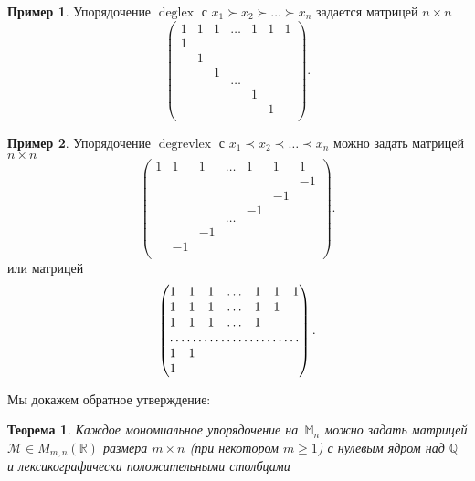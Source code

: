 \documentclass[a4paper,reqno,12pt]{amsart}
\theoremstyle{plain}
\newtheorem{theorem}{Теорема}[section]
\theoremstyle{remark}
\theoremstyle{definition}
\newtheorem{example}{Пример}[section]
\renewcommand{\ge}{\geqslant}
\DeclareMathOperator{\deglex}{deglex}
\DeclareMathOperator{\degrevlex}{degrevlex}
\newcommand{\M} {\mathbb{M}}
\newcommand{\Q}{\mathbb{Q}}
\newcommand{\R}{\mathbb{R}}
\newcommand{\Mat}{\mathcal{M}}
\newcommand{\admOrd}{\prec}
\newcommand{\admOrdG}{\succ}
\begin{document}
\begin{example}
 Упорядочение $\deglex$ с $x_1 \admOrdG x_2 \admOrdG \ldots \admOrdG x_n$ задается матрицей ${n \times n}$
{
$$
 \begin{pmatrix}
  1 & 1 & 1 & \ldots & 1 & 1 & 1 \\
  1 &                            \\    
    & 1                          \\    
    &   & 1                      \\   
    &   &   & \ldots             \\
    &   &   &        & 1         \\
    &   &   &        &   & 1     \\
 \end{pmatrix}.
$$
}
\end{example}

\begin{example}
 Упорядочение $\degrevlex$ с $x_1 \admOrd x_2 \admOrd \ldots \admOrd x_n$ можно задать матрицей ${n \times n}$
{
$$
 \begin{pmatrix}
   1 &  1 &  1 & \ldots &  1 &  1 &  1 \\
     &    &    &        &    &    & -1 \\   
     &    &    &        &    & -1      \\
     &    &    &        & -1           \\
     &    &    & \ldots                \\
     &    & -1                         \\
     & -1                              \\
 \end{pmatrix}.
$$
}
или матрицей
{
$$
 \begin{pmatrix}
   1 &  1 &  1 & \ldots &  1 &  1 &  1 \\
   1 &  1 &  1 & \ldots &  1 &  1      \\   
   1 &  1 &  1 & \ldots &  1           \\
\hdotsfor{7}\\
   1 &  1                              \\
   1                                   \\
 \end{pmatrix}.
$$
}
\end{example}


Мы докажем обратное утверждение:

\begin{theorem}
Каждое мономиальное упорядочение на~$\M_n$ можно задать матрицей $\Mat \in M_{m,n} (\R)$ размера ${m \times n}$
(при некотором $m \ge 1$)
с нулевым ядром над $\Q$ и лексикографически положительными столбцами
\end{theorem}
\end{document}
